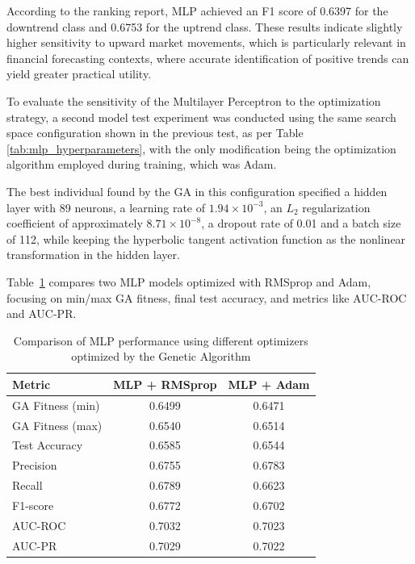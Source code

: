 \documentclass[conference]{IEEEtran}
\begin{document}
According to the ranking report, MLP achieved an F1 score of 0.6397 for the downtrend class and 0.6753 for the uptrend class. These results indicate slightly higher sensitivity to upward market movements, which is particularly relevant in financial forecasting contexts, where accurate identification of positive trends can yield greater practical utility.

To evaluate the sensitivity of the Multilayer Perceptron to the optimization strategy, a second model test experiment was conducted using the same search space configuration shown in the previous test, as per Table \ref{tab:mlp_hyperparameters}, with the only modification being the optimization algorithm employed during training, which was Adam.

The best individual found by the GA in this configuration specified a hidden layer with 89 neurons, a learning rate of \(1.94 \times 10^{-3}\), an \(L_{2}\) regularization coefficient of approximately \(8.71 \times 10^{-8}\), a dropout rate of 0.01 and a batch size of 112, while keeping the hyperbolic tangent activation function as the nonlinear transformation in the hidden layer.

Table~\ref{tab:mlp_optimizer_comparison} compares two MLP models optimized with RMSprop and Adam, focusing on min/max GA fitness, final test accuracy, and metrics like AUC-ROC and AUC-PR.

\begin{table}[H]
\centering
\caption{Comparison of MLP performance using different optimizers optimized by the Genetic Algorithm}
\label{tab:mlp_optimizer_comparison}
\begin{tabular}{lcc}
\hline
\textbf{Metric} & \textbf{MLP + RMSprop} & \textbf{MLP + Adam} \\
\hline
GA Fitness (min) & 0.6499 & 0.6471 \\
GA Fitness (max) & 0.6540 & 0.6514 \\
Test Accuracy   & 0.6585 & 0.6544 \\
Precision       & 0.6755 & 0.6783 \\
Recall          & 0.6789 & 0.6623 \\
F1-score        & 0.6772 & 0.6702 \\
AUC-ROC         & 0.7032 & 0.7023 \\
AUC-PR          & 0.7029 & 0.7022 \\
\hline
\end{tabular}
\end{table}
\end{document}
